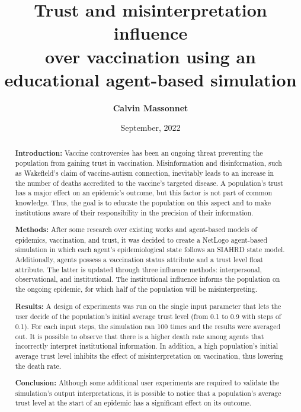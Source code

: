 \documentclass[12pt, a4paper]{memoir} %
\title{\HUGE\sffamily \bfseries \centering Trust and misinterpretation influence\\over vaccination using an\\educational agent-based simulation} %
\author{\LARGE \sffamily \bfseries \centering Calvin Massonnet}
\date{September, 2022} %
\begin{document}
\frontmatter
\begin{titlingpage}
\maketitle
\end{titlingpage}

\setlength{\parskip}{-1pt plus 1pt}

\renewcommand{\abstracttextfont}{\normalfont}
\abstractintoc
\begin{abstract} 
\textbf{Introduction:} Vaccine controversies has been an ongoing threat preventing the population from gaining trust in vaccination. Misinformation and disinformation, such as Wakefield's claim of vaccine-autism connection, inevitably leads to an increase in the number of deaths accredited to the vaccine's targeted disease. A population's trust has a major effect on an epidemic's outcome, but this factor is not part of common knowledge. Thus, the goal is to educate the population on this aspect and to make institutions aware of their responsibility in the precision of their information.

\textbf{Methods:} After some research over existing works and agent-based models of epidemics, vaccination, and trust, it was decided to create a NetLogo agent-based simulation in which each agent's epidemiological state follows an SIAHRD state model. Additionally, agents possess a vaccination status attribute and a trust level float attribute. The latter is updated through three influence methods: interpersonal, observational, and institutional. The institutional influence informs the population on the ongoing epidemic, for which half of the population will be misinterpreting.

\textbf{Results:} A design of experiments was run on the single input parameter that lets the user decide of the population's initial average trust level (from 0.1 to 0.9 with steps of 0.1). For each input steps, the simulation ran 100 times and the results were averaged out. It is possible to observe that there is a higher death rate among agents that incorrectly interpret institutional information. In addition, a high population's initial average trust level inhibits the effect of misinterpretation on vaccination, thus lowering the death rate.

\textbf{Conclusion:} Although some additional user experiments are required to validate the simulation's output interpretations, it is possible to notice that a population's average trust level at the start of an epidemic has a significant effect on its outcome.
\end{abstract}
\abstractintoc
\end{document}
